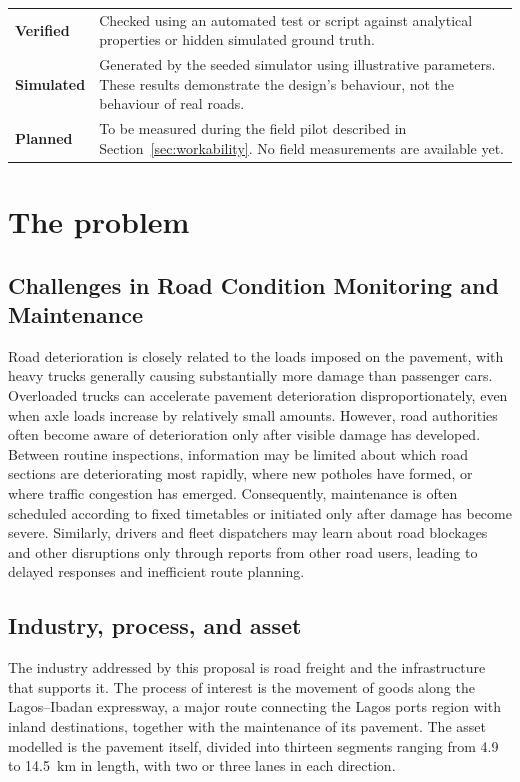 \documentclass[11pt,a4paper]{article}
\begin{document}
\begin{center}
\small
\begin{tabularx}{\textwidth}{@{}L{2.4cm} X@{}}
\toprule
\textbf{Verified} & Checked using an automated test or script against analytical properties or hidden simulated ground truth.\\[3pt]
\textbf{Simulated} & Generated by the seeded simulator using illustrative parameters. These results demonstrate the design's behaviour, not the behaviour of real roads.\\[3pt]
\textbf{Planned} & To be measured during the field pilot described in Section~\ref{sec:workability}. No field measurements are available yet.\\
\bottomrule
\end{tabularx}
\end{center}

\section{The problem}
\subsection{Challenges in Road Condition Monitoring and Maintenance}
Road deterioration is closely related to the loads imposed on the pavement, with heavy trucks generally causing substantially more damage than passenger cars. Overloaded trucks can accelerate pavement deterioration disproportionately, even when axle loads increase by relatively small amounts. However, road authorities often become aware of deterioration only after visible damage has developed. Between routine inspections, information may be limited about which road sections are deteriorating most rapidly, where new potholes have formed, or where traffic congestion has emerged. Consequently, maintenance is often scheduled according to fixed timetables or initiated only after damage has become severe. Similarly, drivers and fleet dispatchers may learn about road blockages and other disruptions only through reports from other road users, leading to delayed responses and inefficient route planning.

\subsection{Industry, process, and asset}
The industry addressed by this proposal is road freight and the infrastructure that supports it. The process of interest is the movement of goods along the Lagos--Ibadan expressway, a major route connecting the Lagos ports region with inland destinations, together with the maintenance of its pavement. The asset modelled is the pavement itself, divided into thirteen segments ranging from 4.9 to 14.5~km in length, with two or three lanes in each direction.
\end{document}
